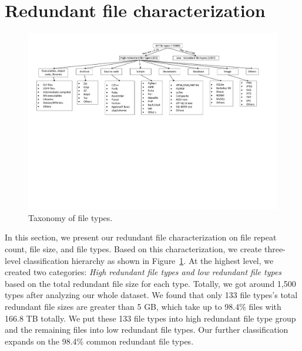 \section{Redundant file characterization}
\label{sec:redundant_files}

\begin{figure}
	\centering
	\includegraphics[width=1\textwidth]{graphs/graph-types-hierarchy}
	\caption{Taxonomy of file types.
	}
	\label{fig:file-type-hierarchy}
\end{figure}

In this section, we present our redundant file characterization on file repeat count, file size, and file types. 
Based on this characterization, we create three-level classification hierarchy as shown in Figure~\ref{fig:file-type-hierarchy}.
At the highest level, we created two categories: \textit{High redundant file types and low redundant file types} based on the total redundant file size for each type. 
Totally, we got around 1,500 types after analyzing our whole dataset. 
We found that only 133 file types's total redundant file sizes are greater than 5 GB, which take up to 98.4\% files with 166.8 TB totally. We put these 133 file types into high redundant file type group and the remaining files into low redundant file types. Our further classification expands on the 98.4\% common redundant file types. 

 
